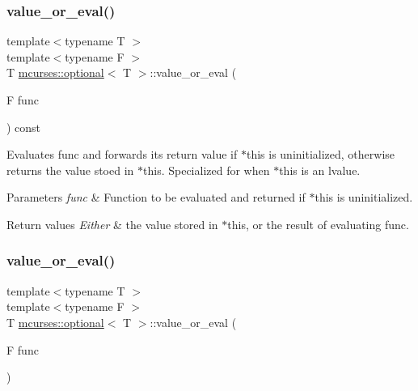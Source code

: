 \subsubsection{\texorpdfstring{value\+\_\+or\+\_\+eval()}{value\_or\_eval()}\hspace{0.1cm}{\footnotesize\ttfamily [1/2]}}
{\footnotesize\ttfamily template$<$typename T $>$ \\
template$<$typename F $>$ \\
T \hyperlink{classmcurses_1_1optional}{mcurses\+::optional}$<$ T $>$\+::value\+\_\+or\+\_\+eval (\begin{DoxyParamCaption}\item[{F}]{func }\end{DoxyParamCaption}) const}

Evaluates func and forwards its return value if $\ast$this is uninitialized, otherwise returns the value stoed in $\ast$this. Specialized for when $\ast$this is an lvalue.


\begin{DoxyParams}{Parameters}
{\em func} & Function to be evaluated and returned if $\ast$this is uninitialized. \\
\hline
\end{DoxyParams}

\begin{DoxyRetVals}{Return values}
{\em Either} & the value stored in $\ast$this, or the result of evaluating func. \\
\hline
\end{DoxyRetVals}
\hypertarget{classmcurses_1_1optional_a05c4a39a77de6c38df1dc8e93716d1c1}{}\label{classmcurses_1_1optional_a05c4a39a77de6c38df1dc8e93716d1c1} 
\subsubsection{\texorpdfstring{value\+\_\+or\+\_\+eval()}{value\_or\_eval()}\hspace{0.1cm}{\footnotesize\ttfamily [2/2]}}
{\footnotesize\ttfamily template$<$typename T $>$ \\
template$<$typename F $>$ \\
T \hyperlink{classmcurses_1_1optional}{mcurses\+::optional}$<$ T $>$\+::value\+\_\+or\+\_\+eval (\begin{DoxyParamCaption}\item[{F}]{func }\end{DoxyParamCaption})}

